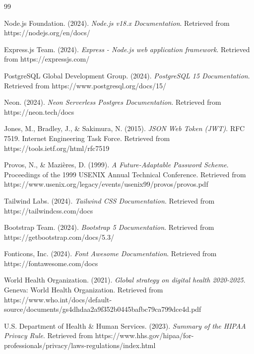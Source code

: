 \begin{thebibliography}{99}

Node.js Foundation. (2024). \textit{Node.js v18.x Documentation}. Retrieved from https://nodejs.org/en/docs/

Express.js Team. (2024). \textit{Express - Node.js web application framework}. Retrieved from https://expressjs.com/

PostgreSQL Global Development Group. (2024). \textit{PostgreSQL 15 Documentation}. Retrieved from https://www.postgresql.org/docs/15/

Neon. (2024). \textit{Neon Serverless Postgres Documentation}. Retrieved from https://neon.tech/docs

Jones, M., Bradley, J., \& Sakimura, N. (2015). \textit{JSON Web Token (JWT)}. RFC 7519. Internet Engineering Task Force. Retrieved from https://tools.ietf.org/html/rfc7519

Provos, N., \& Mazi{\`e}res, D. (1999). \textit{A Future-Adaptable Password Scheme}. Proceedings of the 1999 USENIX Annual Technical Conference. Retrieved from https://www.usenix.org/legacy/events/usenix99/provos/provos.pdf

Tailwind Labs. (2024). \textit{Tailwind CSS Documentation}. Retrieved from https://tailwindcss.com/docs

Bootstrap Team. (2024). \textit{Bootstrap 5 Documentation}. Retrieved from https://getbootstrap.com/docs/5.3/

Fonticons, Inc. (2024). \textit{Font Awesome Documentation}. Retrieved from https://fontawesome.com/docs

World Health Organization. (2021). \textit{Global strategy on digital health 2020-2025}. Geneva: World Health Organization. Retrieved from https://www.who.int/docs/default-source/documents/gs4dhdaa2a9f352b0445bafbc79ca799dce4d.pdf

U.S. Department of Health \& Human Services. (2023). \textit{Summary of the HIPAA Privacy Rule}. Retrieved from https://www.hhs.gov/hipaa/for-professionals/privacy/laws-regulations/index.html


\end{thebibliography}
